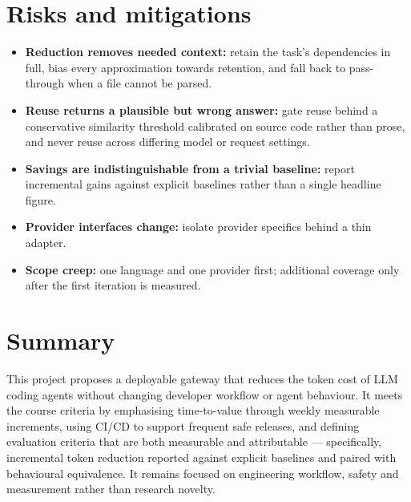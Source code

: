 \documentclass[11pt,a4paper]{article}
\begin{document}
\section{Risks and mitigations}

\begin{itemize}[noitemsep]
  \item \textbf{Reduction removes needed context:} retain the task's
        dependencies in full, bias every approximation towards retention, and
        fall back to pass-through when a file cannot be parsed.
  \item \textbf{Reuse returns a plausible but wrong answer:} gate reuse behind a
        conservative similarity threshold calibrated on source code rather than
        prose, and never reuse across differing model or request settings.
  \item \textbf{Savings are indistinguishable from a trivial baseline:} report
        incremental gains against explicit baselines rather than a single
        headline figure.
  \item \textbf{Provider interfaces change:} isolate provider specifics behind a
        thin adapter.
  \item \textbf{Scope creep:} one language and one provider first; additional
        coverage only after the first iteration is measured.
\end{itemize}

\section{Summary}

This project proposes a deployable gateway that reduces the token cost of LLM
coding agents without changing developer workflow or agent behaviour. It meets
the course criteria by emphasising time-to-value through weekly measurable
increments, using CI/CD to support frequent safe releases, and defining
evaluation criteria that are both measurable and attributable --- specifically,
incremental token reduction reported against explicit baselines and paired with
behavioural equivalence. It remains focused on engineering workflow, safety and
measurement rather than research novelty.
\end{document}
